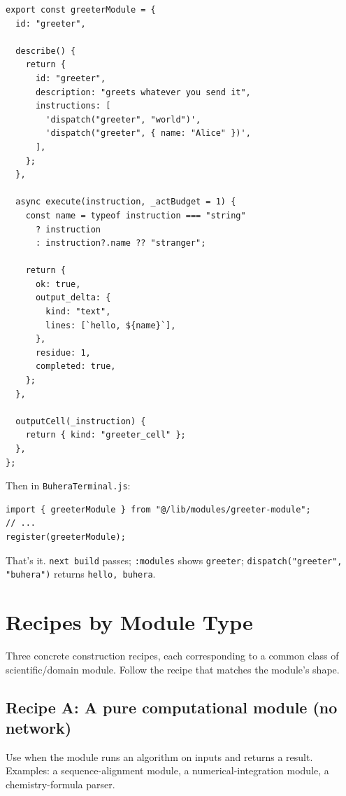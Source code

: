 \documentclass[11pt,a4paper]{article}
\theoremstyle{contract}
\begin{document}
\begin{lstlisting}
export const greeterModule = {
  id: "greeter",

  describe() {
    return {
      id: "greeter",
      description: "greets whatever you send it",
      instructions: [
        'dispatch("greeter", "world")',
        'dispatch("greeter", { name: "Alice" })',
      ],
    };
  },

  async execute(instruction, _actBudget = 1) {
    const name = typeof instruction === "string"
      ? instruction
      : instruction?.name ?? "stranger";

    return {
      ok: true,
      output_delta: {
        kind: "text",
        lines: [`hello, ${name}`],
      },
      residue: 1,
      completed: true,
    };
  },

  outputCell(_instruction) {
    return { kind: "greeter_cell" };
  },
};
\end{lstlisting}

Then in \texttt{BuheraTerminal.js}:

\begin{lstlisting}
import { greeterModule } from "@/lib/modules/greeter-module";
// ...
register(greeterModule);
\end{lstlisting}

That's it. \texttt{next build} passes; \texttt{:modules} shows
\texttt{greeter}; \texttt{dispatch("greeter", "buhera")} returns
\texttt{hello, buhera}.

\section{Recipes by Module Type}
\label{sec:recipes}

Three concrete construction recipes, each corresponding to a common
class of scientific/domain module. Follow the recipe that matches the
module's shape.

\subsection{Recipe A: A pure computational module (no network)}

Use when the module runs an algorithm on inputs and returns a result.
Examples: a sequence-alignment module, a numerical-integration module,
a chemistry-formula parser.
\end{document}
